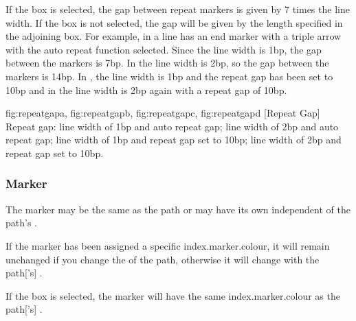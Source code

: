 
If the  box is selected, the gap
between repeat markers is given by 7 times the line width. If the
 box is not selected, the gap will be given by the length specified
in the adjoining box. For example, in 
a line has an end marker with a triple arrow with
the auto repeat function selected. Since the line width is 1\gls{bp}, the
gap between the markers is 7\gls{bp}. In 
the line width is 2\gls{bp}, so the gap between the markers is 14\gls{bp}. In
, the line width is 1\gls{bp} and the repeat
gap has been set to 10\gls{bp} and in 
the line width is 2\gls{bp} again with a repeat gap of 10\gls{bp}.

{
  {fig:repeatgapa}{}{},
  {fig:repeatgapb}{}{},
  {fig:repeatgapc}{}{},
  {fig:repeatgapd}{}{}
}
[Repeat Gap]
{Repeat gap:
 line width of 1\gls{bp} and auto repeat gap;
 line width of 2\gls{bp} and auto repeat gap;
 line width of 1\gls{bp} and repeat gap set to 10\gls{bp};
 line width of 2\gls{bp} and repeat gap set to
10\gls{bp}.}


\subsubsection{Marker }\label{sec:markerpaint}

The marker  may be the same as the
path or may have its own 
independent of the path's .

\begin{information}
If the marker has been assigned a specific \gls{index.marker.colour}, it
will remain unchanged if you change the  of the
\gls*{path}, otherwise it will change with the \gls*{path}['s]
.
\end{information}


If the  box is selected, the marker will
have the same \gls{index.marker.colour} as the \gls*{path}['s]
.

